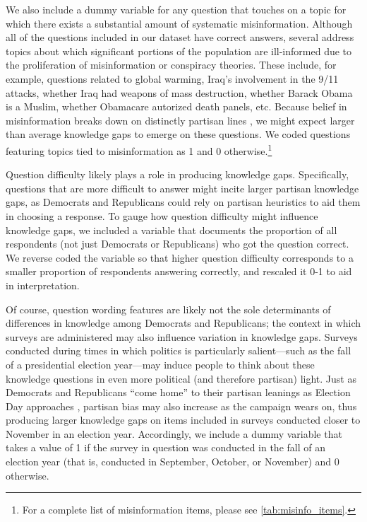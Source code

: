 \documentclass[12pt, letterpaper]{article}
\begin{document}
We also include a dummy variable for any question that touches on a topic for which there exists a substantial amount of systematic misinformation. Although all of the questions included in our dataset have correct answers, several address topics about which significant portions of the population are ill-informed due to the proliferation of misinformation or conspiracy theories. These include, for example, questions related to global warming, Iraq's involvement in the 9/11 attacks, whether Iraq had weapons of mass destruction, whether Barack Obama is a Muslim, whether Obamacare autorized death panels, etc. Because belief in misinformation breaks down on distinctly partisan lines \citep{berinsky_2017,milleretal_2015,nyhan_2020}, we might expect larger than average knowledge gaps to emerge on these questions. We coded questions featuring topics tied to misinformation as 1 and 0 otherwise.\footnote{For a complete list of misinformation items, please see \ref{tab:misinfo_items}.}

Question difficulty likely plays a role in producing knowledge gaps. Specifically, questions that are more difficult to answer might incite larger partisan knowledge gaps, as Democrats and Republicans could rely on partisan heuristics to aid them in choosing a response. To gauge how question difficulty might influence knowledge gaps, we included a variable that documents the proportion of all respondents (not just Democrats or Republicans) who got the question correct. We reverse coded the variable so that higher question difficulty corresponds to a smaller proportion of respondents answering correctly, and rescaled it 0-1 to aid in interpretation. 

Of course, question wording features are likely not the sole determinants of differences in knowledge among Democrats and Republicans; the context in which surveys are administered may also influence variation in knowledge gaps. Surveys conducted during times in which politics is particularly salient---such as the fall of a presidential election year---may induce people to think about these knowledge questions in even more political (and therefore partisan) light. Just as Democrats and Republicans ``come home'' to their partisan leanings as Election Day approaches \citep{eriksonwlezien_2012,henderson_2015,sidesetal_2019,sidesvavreck_2013}, partisan bias may also increase as the campaign wears on, thus producing larger knowledge gaps on items included in surveys conducted closer to November in an election year. Accordingly, we include a dummy variable that takes a value of 1 if the survey in question was conducted in the fall of an election year (that is, conducted in September, October, or November) and 0 otherwise.
\end{document}
